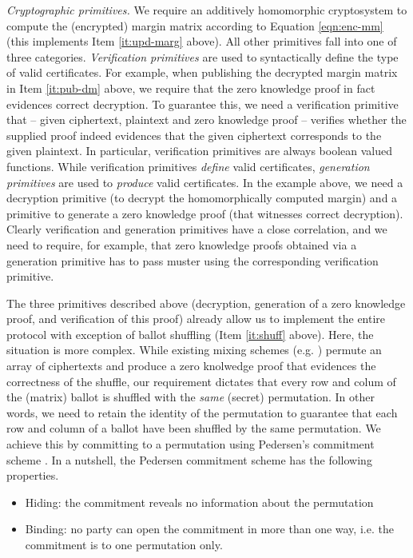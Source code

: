 \documentclass{llncs}
\begin{document}
\smallskip\noindent\emph{Cryptographic primitives.}
We require an additively homomorphic cryptosystem to
compute the (encrypted) margin matrix according to Equation
\ref{eqn:enc-mm} (this implements Item \ref{it:upd-marg} above). All
other primitives fall into one of three categories.
\emph{Verification primitives} are used to syntactically define
the type of valid certificates. For example, when publishing the
decrypted margin matrix in Item \ref{it:pub-dm} above, we require
that the zero knowledge proof in fact evidences correct decryption.
To
guarantee this, we need a verification primitive that -- given
ciphertext, plaintext and zero knowledge proof -- verifies whether the supplied proof
indeed evidences that the given ciphertext corresponds to the given
plaintext. In particular, verification primitives are always boolean
valued functions. While verification primitives \emph{define} valid
certificates, \emph{generation primitives} are used to
\emph{produce} valid certificates. In the example above, we need a
decryption primitive (to decrypt the homomorphically computed
margin) and a primitive to generate a zero knowledge proof (that
witnesses correct decryption). Clearly verification and generation
primitives have a close correlation, and we need to require, for
example, that zero knowledge proofs obtained via a generation
primitive has to pass muster using the corresponding verification
primitive. 

The three primitives described above (decryption, generation of a
zero knowledge proof, and verification of this proof) already allow
us  to implement the entire protocol with exception of ballot
shuffling (Item \ref{it:shuff} above).  Here, the situation is more
complex. While existing mixing schemes (e.g. \cite{Bayer:2012:EZK}) permute 
an array of ciphertexts and produce a zero knolwedge proof that
evidences the correctness of the shuffle, our requirement dictates
that every row and colum of the (matrix) ballot is
shuffled with the \emph{same} (secret) permutation.  In other words,
we need to retain the identity of the permutation to guarantee that
each row and column of a ballot have been shuffled by the same
permutation.
We achieve this by
committing to a permutation using Pedersen's commitment scheme
\cite{Pederson}.
In a nutshell, the Pedersen commitment scheme has the following properties. 
\begin{itemize}
\item Hiding: the commitment reveals no information about the
permutation
\item Binding: no party can open the commitment in more  
	 	than one way, i.e. the commitment is to one permutation only. 
\end{itemize}
\end{document}
